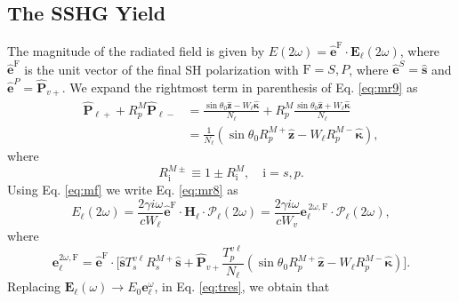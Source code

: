 \documentclass[aps,pra,10pt,amsmath,notitlepage,letterpaper]{revtex4-1}
\begin{document}

\subsection{The SSHG Yield}

The magnitude of the radiated field is given by $E(2\omega) =
\hat{\mathbf{e}}^{\mathrm{F}}\cdot\mathbf{E}_{\ell}(2\omega)$, where
$\hat{\mathbf{e}}^{\mathrm{F}}$ is the unit vector of the final SH polarization
with $\mathrm{F}=S,P$, where $\hat{\mathbf{e}}^S=\hat{\mathbf{s}}$ and
$\hat{\mathbf{e}}^P=\hat{\mathbf{P}}_{v+}$. We expand the rightmost term in
parenthesis of Eq. \eqref{eq:mr9} as
\begin{equation}
\begin{split}
\hat{\mathbf{P}}_{\ell +} + R^{M}_{p}\hat{\mathbf{P}}_{\ell -}
&= \frac{\sin\theta_{0}\hat{\mathbf{z}} - W_{\ell}\hat{\boldsymbol{\kappa}}}
        {N_{\ell}}
 + R^{M}_{p}
   \frac{\sin\theta_{0}\hat{\mathbf{z}} + W_{\ell}\hat{\boldsymbol{\kappa}}}
        {N_{\ell}}\\
&= \frac{1}{N_{\ell}}
\left(
\sin\theta_{0}R^{M+}_{p}\hat{\mathbf{z}}
- W_{\ell}R^{M-}_{p}\hat{\boldsymbol{\kappa}}
\right),
\end{split}
\end{equation}
where
\begin{equation}\label{eq:rm}
R^{M\pm}_{\mathrm{i}}\equiv 1 \pm R^{M}_{\mathrm{i}}, \quad \mathrm{i}=s,p.
\end{equation}
Using Eq. \eqref{eq:mf} we write Eq. \eqref{eq:mr8} as
\begin{equation}\label{eq:r10}
E_{\ell}(2\omega) = \frac{2\gamma i\omega}{cW_\ell}
\hat{\mathbf{e}}^{\mathrm{F}}\cdot\mathbf{H}_{\ell}\cdot
\boldsymbol{\mathcal{P}}_{\ell}(2\omega) 
= \frac{2\gamma i\omega}{cW_{v}}
\mathbf{e}^{\,2\omega,\mathrm{F}}_{\ell}\cdot
\boldsymbol{\mathcal{P}}_{\ell}(2\omega),
\end{equation}
where
\begin{equation}\label{eq:r12mm}
\mathbf{e}^{2\omega,\mathrm{F}}_{\ell} =\hat{\mathbf{e}}^{\mathrm{F}}\cdot 
\Bigg[
\hat{\mathbf{s}}T_{s}^{v\ell}R^{M+}_{s}\hat{\mathbf{s}} + 
\hat{\mathbf{P}}_{v+}
\frac{T^{v\ell}_{p}}
     {N_{\ell}}
\left(
\sin\theta_{0}R^{M+}_{p}\hat{\mathbf{z}}
- W_{\ell}R^{M-}_{p}\hat{\boldsymbol{\kappa}}
\right) 
\Bigg]. 
\end{equation}  
Replacing $\mathbf{E}_{\ell}(\omega)\to E_0\mathbf{e}^{\omega}_\ell$,
in Eq. \eqref{eq:tres}, we obtain that
\end{document}
